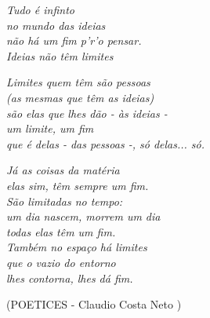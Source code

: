 \documentclass[
	12pt,				%
	openright,			%
	twoside,			%
	a4paper,			%
	chapter=TITLE,		%
	english,			%
	french,				%
	spanish,			%
	brazil				%
	]{abntex2}
\begin{document}
\begin{epigrafe}
    \vspace*{\fill}
	\begin{flushright}
		\textit{Tudo é infinto \\
		no mundo das ideias \\
		não há um fim p'r'o pensar. \\
		Ideias não têm limites \\}
		\end{flushright}

	\begin{flushright}
	\textit{Limites quem têm são pessoas \\
		(as mesmas que têm as ideias) \\
		são elas que lhes dão - às ideias - \\
		um limite, um fim \\
		que é delas - das pessoas -, só delas... só. \\}
	\end{flushright}

	\begin{flushright}
	\textit{Já as coisas da matéria \\
		elas sim, têm sempre um fim.\\
		São limitadas no tempo: \\
		um dia nascem, morrem um dia \\
		todas elas têm um fim. \\
		Também no espaço há limites \\
		que o vazio do entorno \\
		lhes contorna, lhes dá fim. \\}
	\end{flushright}

	\begin{flushright}
	(POETICES - Claudio Costa Neto )
	\end{flushright}
\end{epigrafe}

\end{document}
